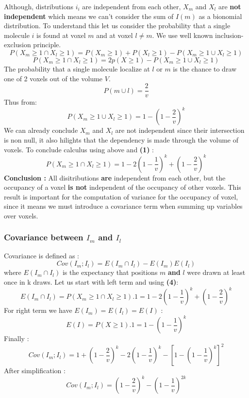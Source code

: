 \documentclass{article}
\begin{document}
Although, distributions $i_i$ are independent from each other, $X_m$ and $X_l$ are \textbf{not independent} which means we can't consider the sum of $I(m)$ as a
bionomial distribution. To understand this let us consider the probability that a single molecule $i$ is found at voxel $m$ and at voxel $l \neq m$.
We use well known inclusion-exclusion principle.
\[
P(X_m \geq 1 \cap X_l \geq 1) = P(X_m \geq 1) + P(X_l \geq 1) - P(X_m\geq 1 \cup X_l\geq 1)
\]
\[
P(X_m \geq 1 \cap X_l \geq 1) = 2p(X \geq 1) - P(X_m\geq 1 \cup X_l\geq 1)
\]
The probability that a single molecule localize at $l$ or $m$ is the chance to draw one of 2 voxels out of the volume $V$.
\[
P(m \cup l) = \frac{2}{v}
\]
Thus from:
\[
P({X_m\geq 1 \cup X_l\geq 1}) = 1 - (1-\frac{2}{v})^{k}
\]
We can already conclude $X_m$ and $X_l$ are not independent since their intersection is non null, it also hilights that the dependency is made through
the volume of voxels. To conclude calculus using above and \textbf{(1)} :
\begin{equation}
    P(X_m \geq 1 \cap X_l \geq 1) =  1 - 2(1-\frac{1}{v})^{k} + (1-\frac{2}{v})^{k} 
\end{equation}
\textbf{Conclusion : }All disitributions \textbf{are} independent from each other, but the occupancy of a voxel \textbf{is not} independent of the
occupancy of other voxels. This result is important for the computation of variance for the occupancy of voxel, since it means we must introduce a 
covariance term when summing up variables over voxels.

\subsubsection{Covariance between $I_m$ and $I_l$}

Covariance is defined as :
\[
Cov(I_m;I_l) = E(I_m \cap I_l) - E(I_m)E(I_l)
\]
where $E(I_m \cap I_l)$ is the expectancy that positions $m$ \textbf{and} $l$ were drawn at least once in k draws. Let us start with left term  and 
using \textbf{(4)}:
\[
E(I_m \cap I_l) = P(X_m \geq 1 \cap X_l \geq 1).1 = 1 - 2(1-\frac{1}{v})^{k} + (1-\frac{2}{v})^{k}
\]
For right term we have $E(I_m) = E(I_l) = E(I)$ :
\[
E(I) = P(X\geq1).1 = 1-(1 - \frac{1}{v})^k
\]
Finally :
\[
Cov(I_m;I_l) =  1 + (1-\frac{2}{v})^{k} - 2(1-\frac{1}{v})^{k} - [1-(1 - \frac{1}{v})^k]^2
\]
After simplification :
\begin{equation}
    Cov(I_m;I_l) = (1-\frac{2}{v})^k - (1-\frac{1}{v})^{2k}
\end{equation}
\end{document}
